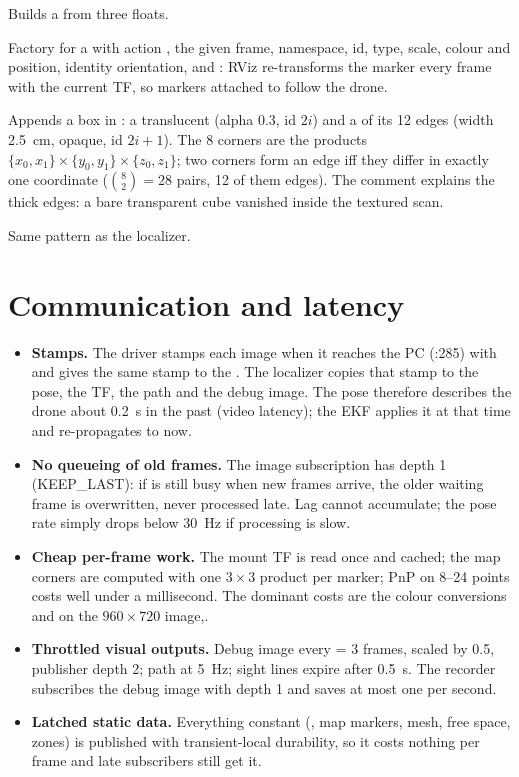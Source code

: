Builds a  from three floats.

Factory for a  with action , the given frame, namespace, id, type, scale,
colour and position, identity orientation, and : RViz re-transforms the marker every
frame with the current TF, so markers attached to  follow the drone.

Appends a box in : a translucent  (alpha 0.3, id $2i$) and a  of its 12 edges
(width 2.5~cm, opaque, id $2i+1$). The 8 corners are the products $\{x_0,x_1\}\times\{y_0,y_1\}\times\{z_0,z_1\}$; two
corners form an edge iff they differ in exactly one coordinate ($\binom82=28$ pairs, 12 of them edges). The comment
explains the thick edges: a bare transparent cube vanished inside the textured scan.

Same pattern as the localizer.

\section{Communication and latency}

\begin{itemize}
\item \textbf{Stamps.} The driver stamps each image when it reaches the PC (:285) with
   and gives the same stamp to the . The localizer copies
  that stamp to the pose, the TF, the path and the debug image. The pose therefore describes the drone about 0.2~s in
  the past (video latency); the EKF applies it at that time and re-propagates to now.
\item \textbf{No queueing of old frames.} The image subscription has depth 1 (KEEP\_LAST): if  is still
  busy when new frames arrive, the older waiting frame is overwritten, never processed late. Lag cannot accumulate; the
  pose rate simply drops below 30~Hz if processing is slow.
\item \textbf{Cheap per-frame work.} The mount TF is read once and cached; the map corners are computed with one
  $3\times3$ product per marker; PnP on 8--24 points costs well under a millisecond. The dominant costs are the
  colour conversions and  on the $960\times720$ image,.
\item \textbf{Throttled visual outputs.} Debug image every  = 3 frames, scaled by 0.5, publisher
  depth 2; path at 5~Hz; sight lines expire after 0.5~s. The recorder subscribes the debug image with depth 1 and saves
  at most one per second.
\item \textbf{Latched static data.} Everything constant (, map markers, mesh, free space, zones) is
  published with transient-local durability, so it costs nothing per frame and late subscribers still get it.
\end{itemize}

